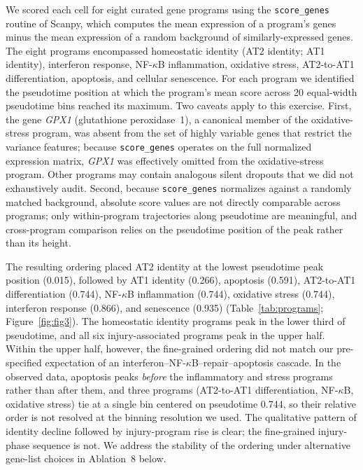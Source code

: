 \documentclass[11pt]{article}
\begin{document}
We scored each cell for eight curated gene programs using the \texttt{score\_genes} routine of Scanpy, which computes the mean expression of a program's genes minus the mean expression of a random background of similarly-expressed genes. The eight programs encompassed homeostatic identity (AT2 identity; AT1 identity), interferon response, NF-$\kappa$B inflammation, oxidative stress, AT2-to-AT1 differentiation, apoptosis, and cellular senescence. For each program we identified the pseudotime position at which the program's mean score across 20 equal-width pseudotime bins reached its maximum. Two caveats apply to this exercise. First, the gene \textit{GPX1} (glutathione peroxidase~1), a canonical member of the oxidative-stress program, was absent from the set of highly variable genes that restrict the variance features; because \texttt{score\_genes} operates on the full normalized expression matrix, \textit{GPX1} was effectively omitted from the oxidative-stress program. Other programs may contain analogous silent dropouts that we did not exhaustively audit. Second, because \texttt{score\_genes} normalizes against a randomly matched background, absolute score values are not directly comparable across programs; only within-program trajectories along pseudotime are meaningful, and cross-program comparison relies on the pseudotime position of the peak rather than its height.

The resulting ordering placed AT2 identity at the lowest pseudotime peak position (0.015), followed by AT1 identity (0.266), apoptosis (0.591), AT2-to-AT1 differentiation (0.744), NF-$\kappa$B inflammation (0.744), oxidative stress (0.744), interferon response (0.866), and senescence (0.935) (Table~\ref{tab:programs}; Figure~\ref{fig:fig3}). The homeostatic identity programs peak in the lower third of pseudotime, and all six injury-associated programs peak in the upper half. Within the upper half, however, the fine-grained ordering did not match our pre-specified expectation of an interferon--NF-$\kappa$B--repair--apoptosis cascade. In the observed data, apoptosis peaks \emph{before} the inflammatory and stress programs rather than after them, and three programs (AT2-to-AT1 differentiation, NF-$\kappa$B, oxidative stress) tie at a single bin centered on pseudotime 0.744, so their relative order is not resolved at the binning resolution we used. The qualitative pattern of identity decline followed by injury-program rise is clear; the fine-grained injury-phase sequence is not. We address the stability of the ordering under alternative gene-list choices in Ablation~8 below.
\end{document}
